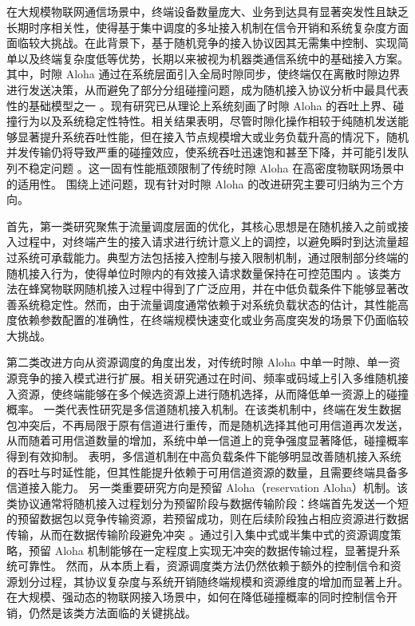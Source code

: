 在大规模物联网通信场景中，终端设备数量庞大、业务到达具有显著突发性且缺乏长期时序相关性，使得基于集中调度的多址接入机制在信令开销和系统复杂度方面面临较大挑战。在此背景下，基于随机竞争的接入协议因其无需集中控制、实现简单以及终端复杂度低等优势，长期以来被视为机器类通信系统中的基础接入方案。其中，时隙 Aloha 通过在系统层面引入全局时隙同步，使终端仅在离散时隙边界进行发送决策，从而避免了部分分组碰撞问题，成为随机接入协议分析中最具代表性的基础模型之一 \cite{1970_Aloha, 2012_DaiAloha}。现有研究已从理论上系统刻画了时隙 Aloha 的吞吐上界、碰撞行为以及系统稳定性特性。相关结果表明，尽管时隙化操作相较于纯随机发送能够显著提升系统吞吐性能，但在接入节点规模增大或业务负载升高的情况下，随机并发传输仍将导致严重的碰撞效应，使系统吞吐迅速饱和甚至下降，并可能引发队列不稳定问题 \cite{2016_massiveAloha}。这一固有性能瓶颈限制了传统时隙 Aloha 在高密度物联网场景中的适用性。
围绕上述问题，现有针对时隙 Aloha 的改进研究主要可归纳为三个方向。

首先，第一类研究聚焦于流量调度层面的优化，其核心思想是在随机接入之前或接入过程中，对终端产生的接入请求进行统计意义上的调控，以避免瞬时到达流量超过系统可承载能力。典型方法包括接入控制与接入限制机制，通过限制部分终端的随机接入行为，使得单位时隙内的有效接入请求数量保持在可控范围内 \cite{2009_SA_Backoff, 2018_SA_EB}。该类方法在蜂窝物联网随机接入过程中得到了广泛应用，并在中低负载条件下能够显著改善系统稳定性。然而，由于流量调度通常依赖于对系统负载状态的估计，其性能高度依赖参数配置的准确性，在终端规模快速变化或业务高度突发的场景下仍面临较大挑战。

第二类改进方向从资源调度的角度出发，对传统时隙 Aloha 中单一时隙、单一资源竞争的接入模式进行扩展。相关研究通过在时间、频率或码域上引入多维随机接入资源，使终端能够在多个候选资源上进行随机选择，从而降低单一资源上的碰撞概率。
一类代表性研究是多信道随机接入机制。在该类机制中，终端在发生数据包冲突后，不再局限于原有信道进行重传，而是随机选择其他可用信道再次发送，从而随着可用信道数量的增加，系统中单一信道上的竞争强度显著降低，碰撞概率得到有效抑制。 \cite{2006_Multichannel,2013_OFDMA,2020_FastRetrial}表明，多信道机制在中高负载条件下能够明显改善随机接入系统的吞吐与时延性能，但其性能提升依赖于可用信道资源的数量，且需要终端具备多信道接入能力。
另一类重要研究方向是预留 Aloha（reservation Aloha）机制。该类协议通常将随机接入过程划分为预留阶段与数据传输阶段：终端首先发送一个短的预留数据包以竞争传输资源，若预留成功，则在后续阶段独占相应资源进行数据传输，从而在数据传输阶段避免冲突 \cite{1973_RAloha, 2024_zhao}。通过引入集中式或半集中式的资源调度策略，预留 Aloha 机制能够在一定程度上实现无冲突的数据传输过程，显著提升系统可靠性。
然而，从本质上看，资源调度类方法仍然依赖于额外的控制信令和资源划分过程，其协议复杂度与系统开销随终端规模和资源维度的增加而显著上升。在大规模、强动态的物联网接入场景中，如何在降低碰撞概率的同时控制信令开销，仍然是该类方法面临的关键挑战。

